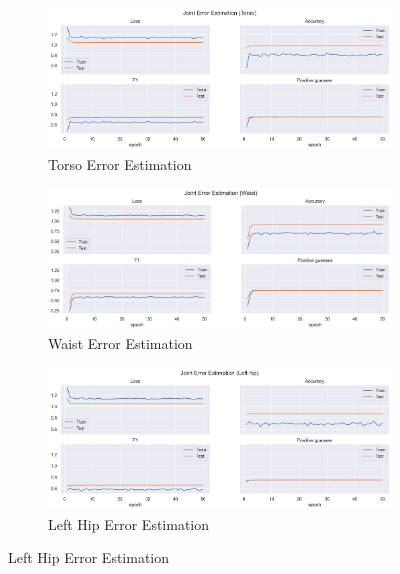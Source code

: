 \begin{figure}[!ht]
  \centering
  \begin{subfigure}[b]{0.47\linewidth}
      \centering
      \includegraphics[width=\textwidth]{figures/Results/v1/jt/Torso_ErrorEstimation.png}
      \caption{Torso Error Estimation}
      \label{fig:v1_torso_jt_ee}
  \end{subfigure}
  \hfill
  \begin{subfigure}[b]{0.47\linewidth}
    \centering
    \includegraphics[width=\textwidth]{figures/Results/v1/jt/Waist_ErrorEstimation.png}
    \caption{Waist Error Estimation}
    \label{fig:v1_waist_jt_ee}
  \end{subfigure}
  \hfill
  \begin{subfigure}[b]{0.47\linewidth}
      \centering
      \includegraphics[width=\textwidth]{figures/Results/v1/jt/Left hip_ErrorEstimation.png}
      \caption{Left Hip Error Estimation}
      \label{fig:v1_lehi_jt_ee}

\end{subfigure}
\end{figure}
